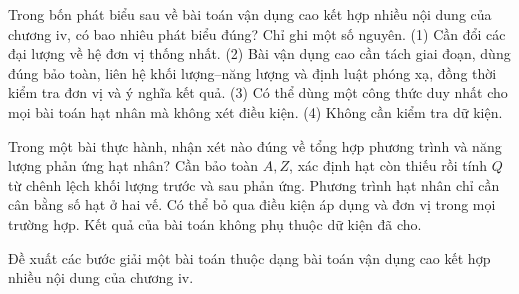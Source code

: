 \begin{ex}
Trong bốn phát biểu sau về bài toán vận dụng cao kết hợp nhiều nội dung của chương iv, có bao nhiêu phát biểu đúng? Chỉ ghi một số nguyên. (1) Cần đổi các đại lượng về hệ đơn vị thống nhất. (2) Bài vận dụng cao cần tách giai đoạn, dùng đúng bảo toàn, liên hệ khối lượng–năng lượng và định luật phóng xạ, đồng thời kiểm tra đơn vị và ý nghĩa kết quả. (3) Có thể dùng một công thức duy nhất cho mọi bài toán hạt nhân mà không xét điều kiện. (4) Không cần kiểm tra dữ kiện.
\end{ex}

\begin{ex}
Trong một bài thực hành, nhận xét nào đúng về tổng hợp phương trình và năng lượng phản ứng hạt nhân?
\choice
{\True Cần bảo toàn $A,Z$, xác định hạt còn thiếu rồi tính $Q$ từ chênh lệch khối lượng trước và sau phản ứng.}
{Phương trình hạt nhân chỉ cần cân bằng số hạt ở hai vế.}
{Có thể bỏ qua điều kiện áp dụng và đơn vị trong mọi trường hợp.}
{Kết quả của bài toán không phụ thuộc dữ kiện đã cho.}
\end{ex}

\begin{bt}
Đề xuất các bước giải một bài toán thuộc dạng bài toán vận dụng cao kết hợp nhiều nội dung của chương iv.
\end{bt}

